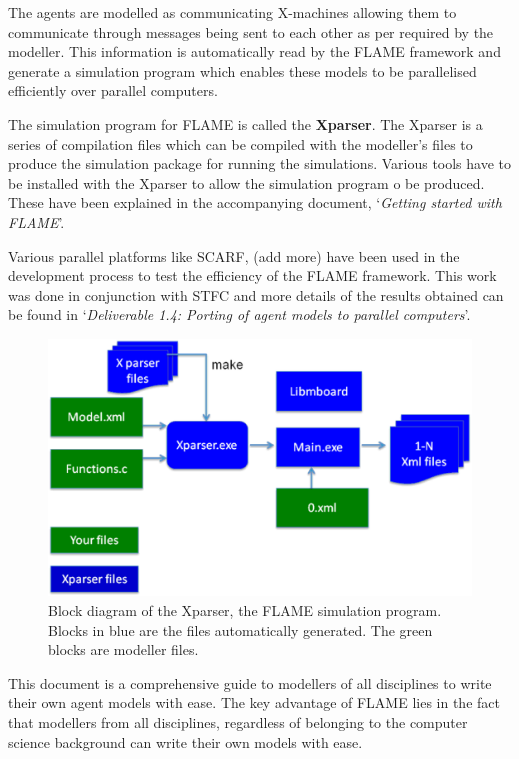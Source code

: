 \documentclass[12pt,a4paper]{article}
\begin{document}
The agents are modelled as communicating X-machines allowing them to
communicate through messages being sent to each other as per
required by the modeller. This information is automatically read by
the FLAME framework and generate a simulation program which enables
these models to be parallelised efficiently over parallel computers.

The simulation program for FLAME is called the \textbf{Xparser}. The
Xparser is a series of compilation files which can be compiled with
the modeller's files to produce the simulation package for running
the simulations. Various tools have to be installed with the Xparser
to allow the simulation program o be produced. These have been
explained in the accompanying document, `\emph{Getting started with
FLAME}'.

Various parallel platforms like SCARF, (add more) have been used in
the development process to test the efficiency of the FLAME
framework. This work was done in conjunction with STFC and more
details of the results obtained can be found in `\emph{Deliverable
1.4: Porting of agent models to parallel computers}'.



\begin{figure}[!htb]
\begin{center}
  \includegraphics*[scale=0.35]{xparserdiag.eps}
  \caption{Block diagram of the Xparser, the FLAME simulation program. Blocks in blue are the files automatically generated. The green blocks are modeller files.}
  \label{fig:xparserdiag}
  \end{center}
\end{figure}

This document is a comprehensive guide to modellers of all
disciplines to write their own agent models with ease. The key
advantage of FLAME lies in the fact that modellers from all
disciplines, regardless of belonging to the computer science
background can write their own models with ease.
\end{document}
